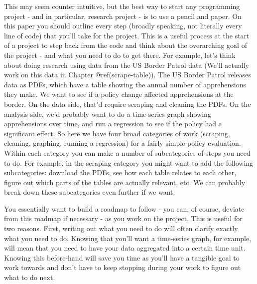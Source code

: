 \documentclass[
  a4paper,
]{krantz}
\begin{document}
This may seem counter intuitive, but the best way to start
any programming project - and in particular, research
project - is to use a pencil and paper. On this paper you
should outline every step (broadly speaking, not literally
every line of code) that you'll take for the project. This
is a useful process at the start of a project to step back
from the code and think about the overarching goal of the
project - and what you need to do to get there. For example,
let's think about doing research using data from the US
Border Patrol data (We'll actually work on this data in
Chapter @ref(scrape-table)). The US Border Patrol releases
data as PDFs, which have a table showing the annual number
of apprehensions they make. We want to see if a policy
change affected apprehensions at the border. On the data
side, that'd require scraping and cleaning the PDFs. On the
analysis side, we'd probably want to do a time-series graph
showing apprehensions over time, and run a regression to see
if the policy had a significant effect. So here we have four
broad categories of work (scraping, cleaning, graphing,
running a regression) for a fairly simple policy evaluation.
Within each category you can make a number of subcategories
of steps you need to do. For example, in the scraping
category you might want to add the following subcategories:
download the PDFs, see how each table relates to each other,
figure out which parts of the tables are actually relevant,
etc. We can probably break down these subcategories even
further if we want.

You essentially want to build a roadmap to follow - you can,
of course, deviate from this roadmap if necessary - as you
work on the project. This is useful for two reasons. First,
writing out what you need to do will often clarify exactly
what you need to do. Knowing that you'll want a time-series
graph, for example, will mean that you need to have your
data aggregated into a certain time unit. Knowing this
before-hand will save you time as you'll have a tangible
goal to work towards and don't have to keep stopping during
your work to figure out what to do next.
\end{document}
